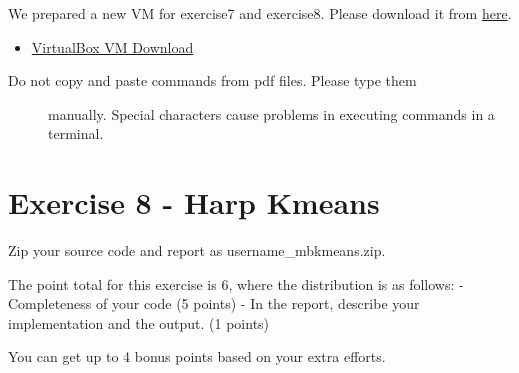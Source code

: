 We prepared a new VM for exercise7 and exercise8. Please download it from
\href{https://drive.google.com/file/d/0B2iFsq4CY1DteHhJUEk5cDNJajQ/view}{here}.

\begin{itemize}
\tightlist
\item
  \href{https://drive.google.com/file/d/0B2iFsq4CY1DteHhJUEk5cDNJajQ/view}{VirtualBox
  VM Download}
\end{itemize}



\begin{description}
\item[Do not copy and paste commands from pdf files. Please type them]
manually. Special characters cause problems in executing commands in a
terminal.
\end{description}

\chapter{Exercise 8 - Harp Kmeans}\label{project-8}

Zip your source code and report as username\_mbkmeans.zip.

The point total for this exercise is 6, where the distribution is as
follows: - Completeness of your code (5 points) - In the report,
describe your implementation and the output. (1 points)

You can get up to 4 bonus points based on your extra efforts.


